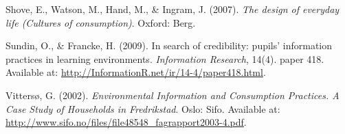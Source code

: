 \documentclass[a4paper,
fontsize=11pt,
oneside,
numbers=noperiodatend,
parskip=half-,
bibliography=totoc,
final
]{scrartcl}
\begin{document}
Shove, E., Watson, M., Hand, M., \& Ingram, J. (2007). \emph{The design
of everyday life (Cultures of consumption)}. Oxford: Berg.

Sundin, O., \& Francke, H. (2009). In search of credibility: pupils'
information practices in learning environments. \emph{Information
Research}, 14(4). paper 418. Available at:
\url{http://InformationR.net/ir/14-4/paper418.html}.

Vittersø, G. (2002). \emph{Environmental Information and Consumption
Practices. A Case Study of Households in Fredrikstad}. Oslo: Sifo.
Available at:
\url{http://www.sifo.no/files/file48548_fagrapport2003-4.pdf}.

\end{document}
